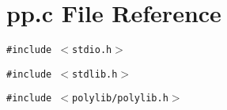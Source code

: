 \section{pp.c File Reference}
\label{pp_8c}
{\tt \#include $<$stdio.h$>$}\par
{\tt \#include $<$stdlib.h$>$}\par
{\tt \#include $<$polylib/polylib.h$>$}\par
